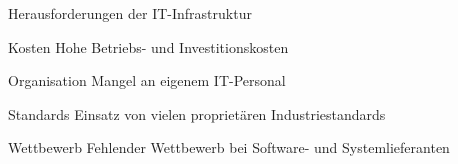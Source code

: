 
\begin{frame}{Herausforderungen der IT-Infrastruktur}
  \begin{block}{Kosten}
    Hohe Betriebs- und Investitionskosten
  \end{block}

  \begin{block}{Organisation}
    Mangel an eigenem IT-Personal
  \end{block}

  \begin{block}{Standards}
    Einsatz von vielen proprietären Industriestandards
  \end{block}

  \begin{block}{Wettbewerb}
    Fehlender Wettbewerb bei Software- und Systemlieferanten
  \end{block}
\end{frame}

